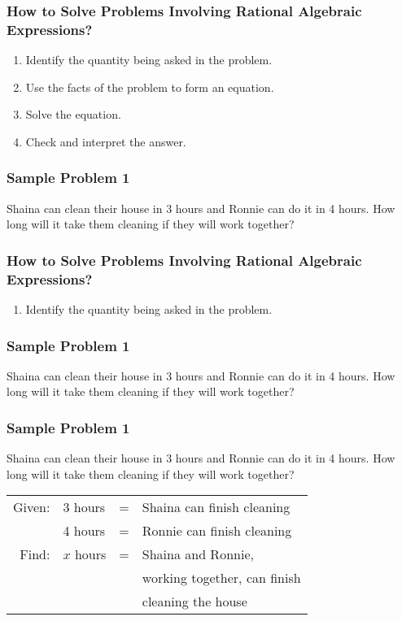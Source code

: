 \documentclass[14pt]{beamer}
\begin{document}
    \begin{frame}
    	\frametitle{How to Solve Problems Involving Rational Algebraic Expressions?}
    	\begin{enumerate}
    		\item<1-> Identify the quantity being asked in the problem.
    		\item<2-> Use the facts of the problem to form an equation.
    	    \item<3-> Solve the equation.
    	    \item<4-> Check and interpret the answer.
       	\end{enumerate}
    \end{frame}

    \begin{frame}
    	\frametitle{Sample Problem 1}
    	Shaina can clean their house in 3 hours and Ronnie can do it in 4 hours. How long will it take them cleaning if they will work together?
    \end{frame}

    \begin{frame}
    	\frametitle{How to Solve Problems Involving Rational Algebraic Expressions?}
    	\begin{enumerate}
    		\item Identify the quantity being asked in the problem.
    	\end{enumerate}
    \end{frame}

    \begin{frame}
    	\frametitle{Sample Problem 1}
    	Shaina can clean their house in 3 hours and Ronnie can do it in 4 hours. How long will it take them cleaning if they will work together?    	
    \end{frame}

    \begin{frame}
    	\frametitle{Sample Problem 1}
    	Shaina can clean their house in 3 hours and Ronnie can do it in 4 hours. How long will it take them cleaning if they will work together?    	
    	
    	\vspace{1em}
    	\noindent\begin{tabular}{rlcl}
    		\pause Given: & 3 hours & = & Shaina can finish cleaning \\
    		\pause & 4 hours & = & Ronnie can finish cleaning \\
    		\pause Find: & $ x $ hours & = & Shaina and Ronnie, \\
    		 & & & working together, can finish \\
    		 & & & cleaning the house \\
    	\end{tabular}
    \end{frame}
\end{document}
